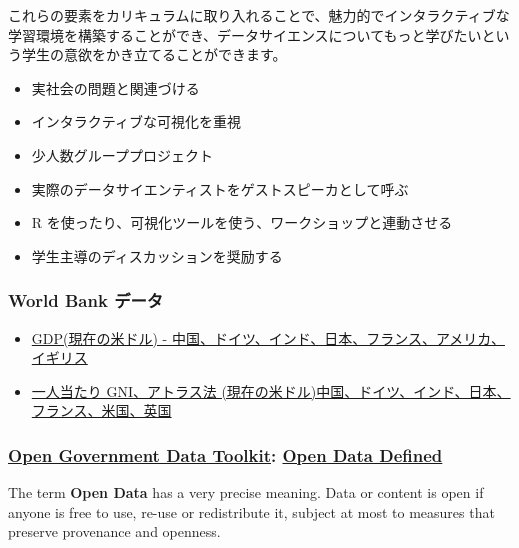 \documentclass[
]{bxjsbook}
\providecommand{\tightlist}{%
  \setlength{\itemsep}{0pt}\setlength{\parskip}{0pt}}
\theoremstyle{definition}
\theoremstyle{definition}
\theoremstyle{definition}
\theoremstyle{definition}
\theoremstyle{remark}
\begin{document}
これらの要素をカリキュラムに取り入れることで、魅力的でインタラクティブな学習環境を構築することができ、データサイエンスについてもっと学びたいという学生の意欲をかき立てることができます。

\begin{itemize}
\tightlist
\item
  実社会の問題と関連づける
\item
  インタラクティブな可視化を重視
\item
  少人数グループプロジェクト
\item
  実際のデータサイエンティストをゲストスピーカとして呼ぶ
\item
  R を使ったり、可視化ツールを使う、ワークショップと連動させる
\item
  学生主導のディスカッションを奨励する
\end{itemize}

\hypertarget{world-bank-ux30c7ux30fcux30bf}{%
\subsubsection{World Bank データ}\label{world-bank-ux30c7ux30fcux30bf}}

\begin{itemize}
\item
  \href{https://data.worldbank.org/indicator/NY.GDP.MKTP.CD?end=2021\&locations=CN-DE-IN-JP-FR-US-GB\&start=1960\&view=chart}{GDP(現在の米ドル) - 中国、ドイツ、インド、日本、フランス、アメリカ、イギリス}
\item
  \href{https://data.worldbank.org/indicator/NY.GNP.PCAP.CD?locations=CN-DE-IN-JP-FR-US-GB}{一人当たり GNI、アトラス法 (現在の米ドル)中国、ドイツ、インド、日本、フランス、米国、英国}
\end{itemize}

\hypertarget{open-government-data-toolkit-open-data-defined}{%
\subsubsection{\texorpdfstring{\href{http://opendatatoolkit.worldbank.org}{Open Government Data Toolkit}: \href{http://opendatatoolkit.worldbank.org/en/essentials.html}{Open Data Defined}}{Open Government Data Toolkit: Open Data Defined}}\label{open-government-data-toolkit-open-data-defined}}

The term \textbf{Open Data} has a very precise meaning. Data or content is open if anyone is free to use, re-use or redistribute it, subject at most to measures that preserve provenance and openness.
\end{document}
